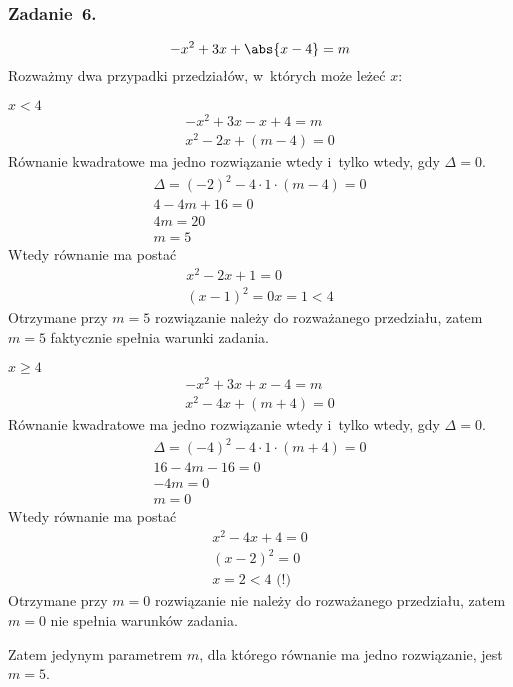 \subsubsection*{Zadanie~6.}
\begin{equation*}
    -x^2 + 3x + \abs{x - 4} = m
\end{equation*}
Rozważmy dwa przypadki przedziałów, w~których może leżeć \(x\):
\begin{proofcases}
    \item \(x < 4\)
        \begin{gather*}
            -x^2 + 3x - x + 4 = m\\
            x^2 - 2x + (m - 4) = 0
        \end{gather*}
        Równanie kwadratowe ma jedno rozwiązanie wtedy i~tylko wtedy, gdy \(\Delta = 0\).
        \begin{gather*}
            \Delta = (-2)^2 - 4 \cdot 1 \cdot (m - 4) = 0\\
            4 - 4m + 16 = 0\\
            4m = 20\\
            m = 5
        \end{gather*}
        Wtedy równanie ma postać
        \begin{gather*}
            x^2 - 2x + 1 = 0\\
            (x - 1)^2 = 0
            x = 1 < 4
        \end{gather*}
        Otrzymane przy \(m = 5\) rozwiązanie należy do rozważanego przedziału, zatem \(m = 5\) faktycznie spełnia warunki zadania.
    \item \(x \geq 4\)
        \begin{gather*}
            -x^2 + 3x + x - 4 = m\\
            x^2 - 4x + (m + 4) = 0
        \end{gather*}
        Równanie kwadratowe ma jedno rozwiązanie wtedy i~tylko wtedy, gdy \(\Delta = 0\).
        \begin{gather*}
            \Delta = (-4)^2 - 4 \cdot 1 \cdot (m + 4) = 0\\
            16 - 4m - 16 = 0\\
            -4m = 0\\
            m = 0
        \end{gather*}
        Wtedy równanie ma postać
        \begin{gather*}
            x^2 - 4x + 4 = 0\\
            (x - 2)^2 = 0\\
            x = 2 < 4 \text{ (!)}
        \end{gather*}
        Otrzymane przy \(m = 0\) rozwiązanie nie należy do rozważanego przedziału, zatem \(m = 0\) nie spełnia warunków zadania.
\end{proofcases}
Zatem jedynym parametrem \(m\), dla którego równanie ma jedno rozwiązanie, jest \(m = 5\).
